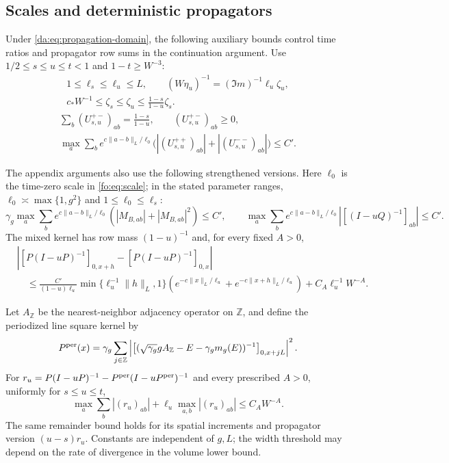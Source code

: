 \documentclass[11pt]{article}
\numberwithin{equation}{section}
\theoremstyle{remark}
\begin{document}
\subsection{Scales and deterministic propagators}\label{app:main-propagators}
Under \eqref{da:eq:propagation-domain}, the following auxiliary bounds
control time ratios and propagator row sums in the continuation argument.
Use $1/2\le s\le u\le t<1$ and $1-t\ge W^{-3}$:
\begin{equation}\label{gc:eq:scale}
 \begin{gathered}
 1\le\ell_s\le\ell_u\le L,\qquad
 (W\eta_u)^{-1}=(\Im m)^{-1} \ell_u\zeta_u,\\
 c_*W^{-1}\le\zeta_s\le\zeta_u
       \le\frac{1-s}{1-u}\zeta_s.
 \end{gathered}
\end{equation}
\begin{equation}\label{gc:eq:propagator-input}
 \begin{gathered}
 \sum_b(U_{s,u}^{+-})_{ab}=\frac{1-s}{1-u},\qquad
 (U_{s,u}^{+-})_{ab}\ge0,\\
 \max_a\sum_b e^{c\|a-b\|_L/\ell_0}
       \bigl(|(U_{s,u}^{++})_{ab}|+|(U_{s,u}^{--})_{ab}|\bigr)\le C'.
 \end{gathered}
\end{equation}

The appendix arguments also use the following strengthened versions.
Here $\ell_0$ is the time-zero scale in \eqref{fo:eq:scale}; in the
stated parameter ranges, $\ell_0\asymp\max\{1,g^2\}$ and
$1\le\ell_0\le\ell_s$:
\begin{equation}\label{da:eq:weighted-propagation-dyson}
 \gamma_g\max_a\sum_b e^{c\|a-b\|_L/\ell_0}
       (|M_{B,ab}|+|M_{B,ab}|^2)\le C',\qquad
 \max_a\sum_b e^{c\|a-b\|_L/\ell_0}|[(I-uQ)^{-1}]_{ab}|\le C'.
\end{equation}
The mixed kernel has row mass $(1-u)^{-1}$ and, for every fixed $A>0$,
\begin{equation}\label{da:eq:mixed-profile-increment}
 \begin{aligned}
 &|[P(I-uP)^{-1}]_{0,x+h}-[P(I-uP)^{-1}]_{0,x}|\\
 &\quad\le\frac {C'}{(1-u)\ell_u}
      \min\{\ell_u^{-1}\|h\|_L,1\}
      (e^{-c\|x\|_L/\ell_u}+e^{-c\|x+h\|_L/\ell_u})
      +C_A\ell_u^{-1}W^{-A}.
 \end{aligned}
\end{equation}

Let $A_{\mathbb Z}$ be the nearest-neighbor adjacency operator on
$\mathbb Z$, and define the periodized line square kernel by
\[
 P^{\rm per}(x)=\gamma_g\sum_{j\in\mathbb Z}
 \left|\left[(\sqrt{\gamma_g}gA_{\mathbb Z}-E-
           \gamma_g m_g(E))^{-1}\right]_{0,x+jL}\right|^2.
\]
For $r_u=P(I-uP)^{-1}-P^{\rm per}(I-uP^{\rm per})^{-1}$ and every
prescribed $A>0$, uniformly for $s\le u\le t$,
\begin{equation}\label{gc:eq:kernel-remainder}
 \max_a\sum_b|(r_u)_{ab}|+\ell_u\max_{a,b}|(r_u)_{ab}|\le C_AW^{-A}.
\end{equation}
The same remainder bound holds for its spatial increments and
propagator version $(u-s)r_u$. Constants are independent of $g,L$; the width threshold
may depend on the rate of divergence in the volume lower bound.
\end{document}
